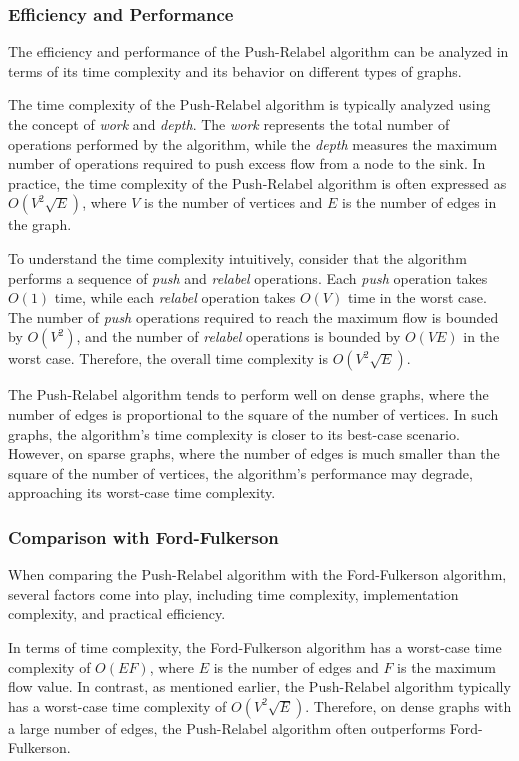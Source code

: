 \documentclass[12pt]{book} %
\begin{document}
\subsubsection{Efficiency and Performance}
The efficiency and performance of the Push-Relabel algorithm can be analyzed in terms of its time complexity and its behavior on different types of graphs.

The time complexity of the Push-Relabel algorithm is typically analyzed using the concept of \textit{work} and \textit{depth}. The \textit{work} represents the total number of operations performed by the algorithm, while the \textit{depth} measures the maximum number of operations required to push excess flow from a node to the sink. In practice, the time complexity of the Push-Relabel algorithm is often expressed as \(O(V^2 \sqrt{E})\), where \(V\) is the number of vertices and \(E\) is the number of edges in the graph.

To understand the time complexity intuitively, consider that the algorithm performs a sequence of \textit{push} and \textit{relabel} operations. Each \textit{push} operation takes \(O(1)\) time, while each \textit{relabel} operation takes \(O(V)\) time in the worst case. The number of \textit{push} operations required to reach the maximum flow is bounded by \(O(V^2)\), and the number of \textit{relabel} operations is bounded by \(O(VE)\) in the worst case. Therefore, the overall time complexity is \(O(V^2 \sqrt{E})\).

The Push-Relabel algorithm tends to perform well on dense graphs, where the number of edges is proportional to the square of the number of vertices. In such graphs, the algorithm's time complexity is closer to its best-case scenario. However, on sparse graphs, where the number of edges is much smaller than the square of the number of vertices, the algorithm's performance may degrade, approaching its worst-case time complexity.


\subsubsection{Comparison with Ford-Fulkerson}
When comparing the Push-Relabel algorithm with the Ford-Fulkerson algorithm, several factors come into play, including time complexity, implementation complexity, and practical efficiency.

In terms of time complexity, the Ford-Fulkerson algorithm has a worst-case time complexity of \(O(EF)\), where \(E\) is the number of edges and \(F\) is the maximum flow value. In contrast, as mentioned earlier, the Push-Relabel algorithm typically has a worst-case time complexity of \(O(V^2 \sqrt{E})\). Therefore, on dense graphs with a large number of edges, the Push-Relabel algorithm often outperforms Ford-Fulkerson.
\end{document}
